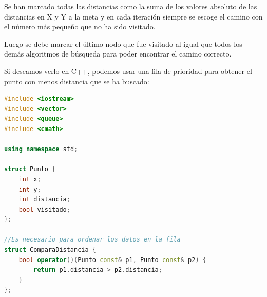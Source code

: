 \documentclass{article}
\begin{document}
Se han marcado todas las distancias como la suma de los valores absoluto de las distancias en X y Y a la meta y en cada iteración siempre se escoge el camino con el número más pequeño que no ha sido visitado.

Luego se debe marcar el último nodo que fue visitado al igual que todos los demás algoritmos de búsqueda para poder encontrar el camino correcto.

Si deseamos verlo en C++, podemos usar una fila de prioridad para obtener el punto con menos distancia que se ha buscado:

\begin{lstlisting}[language=C++, caption=A*]
#include <iostream>
#include <vector>
#include <queue>
#include <cmath>

using namespace std;

struct Punto {
    int x;
    int y;
    int distancia;
    bool visitado;
};

//Es necesario para ordenar los datos en la fila
struct ComparaDistancia {
    bool operator()(Punto const& p1, Punto const& p2) {
        return p1.distancia > p2.distancia;
    }
};


\end{lstlisting}
\end{document}
